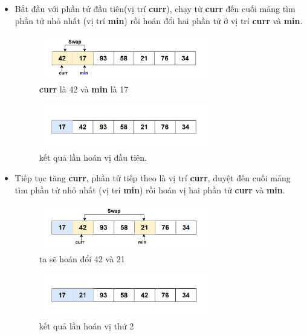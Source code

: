 \begin{itemize}
\item Bắt đầu với phần tử đầu tiên(vị trí \textbf{curr}), chạy từ \textbf{curr} đến cuối mảng tìm phần tử nhỏ nhất (vị trí \textbf{min}) rồi hoán đổi hai phần tử ở vị trí \textbf{curr} và \textbf{min}. 
\begin{figure}[H]
    \centering
    \includegraphics[width=0.7\textwidth]{img/selection sort_suadoi/2.png}
    \caption{\textbf{curr} là 42 và \textbf{min} là 17 }
\end{figure}

\begin{figure}[H]
    \centering
    \includegraphics[width=0.7\textwidth]{img/selection sort_suadoi/3.png}
    \caption{kết quả lần hoán vị đầu tiên.}
\end{figure}

\item Tiếp tục tăng \textbf{curr}, phần tử tiếp theo là vị trí \textbf{curr}, duyệt đến cuối mảng tìm phần tử nhỏ nhất (vị trí \textbf{min}) rồi hoán vị hai phần tử \textbf{curr} và \textbf{min}.

\begin{figure}[H]
    \centering
    \includegraphics[width=0.7\textwidth]{img/selection sort_suadoi/4.png}
    \caption{ta sẽ hoán đổi 42 và 21}
\end{figure}

\begin{figure}[H]
    \centering
    \includegraphics[width=0.7\textwidth]{img/selection sort_suadoi/5.png}
    \caption{kết quả lần hoán vị thứ 2} 
\end{figure}


\end{itemize}
